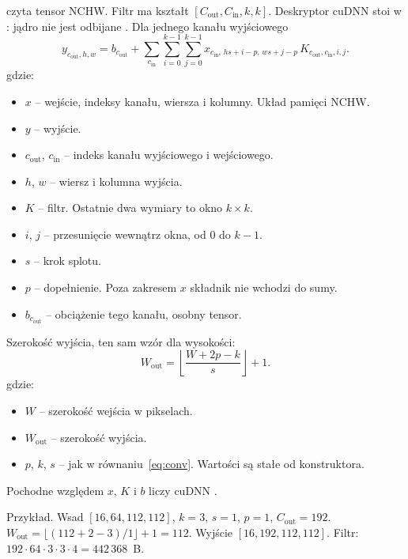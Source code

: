 czyta tensor NCHW. Filtr ma kształt \([C_{\mathrm{out}}, C_{\mathrm{in}}, k, k]\). Deskryptor cuDNN stoi w : jądro nie jest odbijane \cite{nvidia-cudnn}. Dla jednego kanału wyjściowego
\begin{equation}
\label{eq:conv}
y_{c_{\mathrm{out}}, h, w}
  = b_{c_{\mathrm{out}}}
  + \sum_{c_{\mathrm{in}}} \sum_{i=0}^{k-1} \sum_{j=0}^{k-1}
    x_{c_{\mathrm{in}},\, hs + i - p,\, ws + j - p}\,
    K_{c_{\mathrm{out}}, c_{\mathrm{in}}, i, j}.
\end{equation}
gdzie:
\begin{itemize}
\item \(x\) -- wejście, indeksy kanału, wiersza i kolumny. Układ pamięci NCHW.
\item \(y\) -- wyjście.
\item \(c_{\mathrm{out}}\), \(c_{\mathrm{in}}\) -- indeks kanału wyjściowego i wejściowego.
\item \(h\), \(w\) -- wiersz i kolumna wyjścia.
\item \(K\) -- filtr. Ostatnie dwa wymiary to okno \(k \times k\).
\item \(i\), \(j\) -- przesunięcie wewnątrz okna, od \(0\) do \(k-1\).
\item \(s\) -- krok splotu.
\item \(p\) -- dopełnienie. Poza zakresem \(x\) składnik nie wchodzi do sumy.
\item \(b_{c_{\mathrm{out}}}\) -- obciążenie tego kanału, osobny tensor.
\end{itemize}

Szerokość wyjścia, ten sam wzór dla wysokości:
\begin{equation}
\label{eq:conv-out}
W_{\mathrm{out}}
  = \left\lfloor \frac{W + 2p - k}{s} \right\rfloor + 1.
\end{equation}
gdzie:
\begin{itemize}
\item \(W\) -- szerokość wejścia w pikselach.
\item \(W_{\mathrm{out}}\) -- szerokość wyjścia.
\item \(p\), \(k\), \(s\) -- jak w równaniu~\eqref{eq:conv}. Wartości są stałe od konstruktora.
\end{itemize}

Pochodne względem \(x\), \(K\) i \(b\) liczy cuDNN \cite{chetlur2014cudnn}.

Przykład. Wsad \([16, 64, 112, 112]\), \(k = 3\), \(s = 1\), \(p = 1\), \(C_{\mathrm{out}} = 192\). \(W_{\mathrm{out}} = \lfloor (112 + 2 - 3) / 1 \rfloor + 1 = 112\). Wyjście \([16, 192, 112, 112]\). Filtr: \(192 \cdot 64 \cdot 3 \cdot 3 \cdot 4 = 442\,368\)~B.

